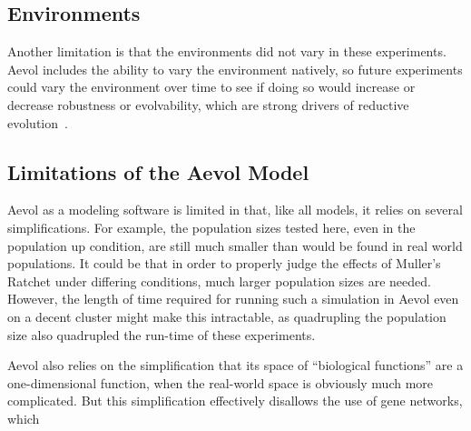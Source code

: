 \subsection{Environments}
Another limitation is that the environments did not vary in these experiments. Aevol includes the ability to vary the environment natively, so future experiments could vary the environment over time to see if doing so would increase or decrease robustness or evolvability, which are strong drivers of reductive evolution~\cite{Batut.2013}. 

\subsection{Limitations of the Aevol Model}
Aevol as a modeling software is limited in that, like all models, it relies on several simplifications. For example, the population sizes tested here, even in the population up condition, are still much smaller than would be found in real world populations. It could be that in order to properly judge the effects of Muller's Ratchet under differing conditions, much larger population sizes are needed. However, the length of time required for running such a simulation in Aevol even on a decent cluster might make this intractable, as quadrupling the population size also quadrupled the run-time of these experiments. 

Aevol also relies on the simplification that its space of ``biological functions'' are a one-dimensional function, when the real-world space is obviously much more complicated. But this simplification effectively disallows the use of gene networks, which %

